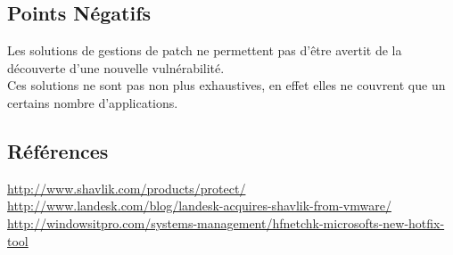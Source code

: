\subsection{Points Négatifs}
Les solutions de gestions de patch ne permettent pas d’être avertit de la découverte d’une nouvelle vulnérabilité.\\

Ces solutions ne sont pas non plus exhaustives, en effet elles ne couvrent que un certains nombre d’applications.\\

\subsection{Références}
\small
\noindent
\url{http://www.shavlik.com/products/protect/}\newline
\url{http://www.landesk.com/blog/landesk-acquires-shavlik-from-vmware/}\newline
\url{http://windowsitpro.com/systems-management/hfnetchk-microsofts-new-hotfix-tool}\newline
\normalsize
